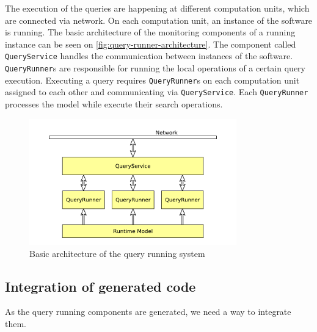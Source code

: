 The execution of the queries are happening at different computation units, which are connected via network.
On each computation unit, an instance of the software is running.
The basic architecture of the monitoring components of a running instance can be seen on \autoref{fig:query-runner-architecture}. 
The component called \texttt{QueryService} handles the communication between instances of the software.
\texttt{QueryRunner}s are responsible for running the local operations of a certain query execution. Executing a query requires \texttt{QueryRunner}s on each computation unit assigned to each other and communicating via \texttt{QueryService}. 
Each \texttt{QueryRunner} processes the model while execute their search operations.

\begin{figure}[H]
	\begin{center}
		\includegraphics[width=0.8\textwidth]{figures/query-runner-architecture.pdf}
		\caption{ Basic architecture of the query running system }
		\label{fig:query-runner-architecture}
	\end{center}
\end{figure}

\subsection{Integration of generated code}

As the query running components are generated, we need a way to integrate them.









